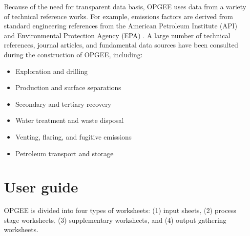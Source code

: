 \documentclass[11pt]{report}
\begin{document}
Because of the need for transparent data basis, OPGEE uses data from a variety of technical reference works. For example, emissions factors are derived from standard engineering references from the American Petroleum Institute (API) and Environmental Protection Agency (EPA) \cite{EPA1995, Shires2004}. A large number of technical references, journal articles, and fundamental data sources have been consulted during the construction of OPGEE, including: 
\begin{itemize}
\item Exploration and drilling \cite{Shires2004, Azar2007, Devereux1998, Gidley1989, Lapeyrouse2002, Mitchell2006, Mitchell2011, Wilson1999}
\item Production and surface separations \cite{Shires2004, EPA1995, API1991, API1993a, API1995a, API1996b, API1998a, API2003, API2006, API2008a, API2008b, API2009a, API2009b, API2009c, API2009d, Arnold2007, Chilingarian1987, Chilingarian1989, Cholet2000, Clegg2007, Fanchi2007, GPSA2004, Holstein2007a, Holstein2007b, Leffler2006, Manning1991, Manning1995, Stewart2008, Stewart2009, Stewart2011, Takacs1993, Takacs2003}
\item Secondary and tertiary recovery \cite{Craig1993, Jarrell2002, Prats1985, Rose1989, Warner2007, Green1998}
\item Water treatment and waste disposal \cite{Wilson1999, Manning1995, Stewart2011, Khatib2002, Neff2007, Reed1996, Veil2004}
\item Venting, flaring, and fugitive emissions \cite{API1991, API1993a, API1995a, API1996b, API1998a, API1998b, API1998c, API2003, API2006, API2008a, API2008b, API2008c, API2009a, API1993b, API1995a, API2009e}
\item Petroleum transport and storage \cite{API2006, GPSA2004, API1993b, API1995b, API1997, API2009a, Mcallister2009, Miesner2006, Szilas1985}
\end{itemize}

\clearpage



\chapter{User guide}

OPGEE is divided into four types of worksheets: (1) input sheets, (2) process stage worksheets, (3) supplementary worksheets, and (4) output gathering worksheets.
\end{document}
